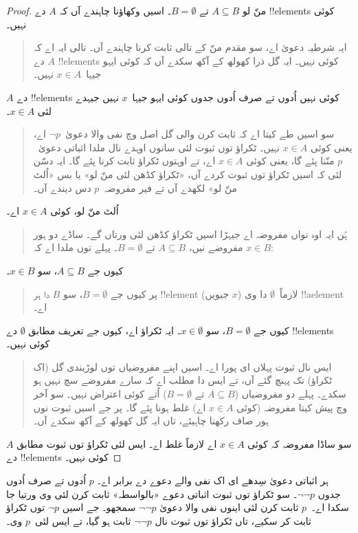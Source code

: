 \documentclass[../../../include/open-logic-section]{subfiles}
\begin{document}
\begin{proof}
  منّ لو $A \subseteq B$ تے $B = \emptyset$۔ اسیں وکھاؤنا چاہندے آں کہ $A$ دے !!{element}s کوئی نہیں۔
  \begin{quote}
    ایہ شرطیہ دعویٰ اے، سو مقدم منّ کے تالی ثابت کرنا چاہندے آں۔ تالی ایہ اے کہ $A$ دے !!{element}s کوئی نہیں۔ ایہ گل ذرا کھولھ کے آکھ سکدے آں کہ کوئی ایہو جیہا~$x \in A$ نہیں۔
  \end{quote}
  $A$ دے !!{element}s کوئی نہیں اُدوں تے صرف اُدوں جدوں کوئی ایہو جیہا~$x$ نہیں جیہدے لئی $x \in A$۔
  \begin{quote}
    سو اسیں طے کیتا اے کہ ثابت کرن والی گل اصل وچ نفی والا دعویٰ~$\lnot p$ اے، یعنی کوئی $x \in A$ نہیں۔ ٹکراؤ توں ثبوت لئی سانوں اوہدے نال ملدا اثباتی دعویٰ~$p$ منّنا پئے گا، یعنی کوئی $x \in A$ اے، تے اوہتوں ٹکراؤ ثابت کرنا پئے گا۔ ایہ دسّن لئی کہ اسیں ٹکراؤ توں ثبوت کردے آں، «ٹکراؤ کڈھن لئی منّ لو» یا بس «اُلٹ منّ لو» لکھدے آں تے فیر مفروضہ~$p$ دس دیندے آں۔
  \end{quote}
  اُلٹ منّ لو، کوئی $x \in A$ اے۔
  \begin{quote}
    ہُن ایہ اوہ نواں مفروضہ اے جیہڑا اسیں ٹکراؤ کڈھن لئی ورتاں گے۔ ساڈے دو ہور مفروضے نیں، $A \subseteq B$ تے $B = \emptyset$۔ پہلے توں ملدا اے کہ $x \in B$:
  \end{quote}
  کیوں جے $A \subseteq B$، سو $x \in B$۔
  \begin{quote}
    پر کیوں جے $B = \emptyset$، سو $B$ دا ہر !!{element} (جیویں $x$) لازماً~$\emptyset$ دا وی !!a{element} اے۔
  \end{quote}
  کیوں جے $B = \emptyset$، سو $x \in \emptyset$۔ ایہ ٹکراؤ اے، کیوں جے تعریف مطابق $\emptyset$ دے !!{element}s کوئی نہیں۔
  \begin{quote}
    ایس نال ثبوت پہلاں ای پورا اے۔ اسیں اپنے مفروضیاں توں لوڑیندی گل (اک ٹکراؤ) تک پہنچ گئے آں، تے ایس دا مطلب اے کہ سارے مفروضے سچ نہیں ہو سکدے۔ پہلے دو مفروضیاں ($A \subseteq B$ تے $B = \emptyset$) اُتے کوئی اعتراض نہیں۔ سو آخر وچ پیش کیتا مفروضہ (کوئی $x \in A$ اے) غلط ہونا پئے گا۔ پر جے اسیں ثبوت نوں ہور صاف رکھنا چاہیئے، تاں ایہ گل کھولھ کے آکھ سکدے آں۔
  \end{quote}
  سو ساڈا مفروضہ کہ کوئی $x \in A$ اے لازماً غلط اے۔ ایس لئی ٹکراؤ توں ثبوت مطابق $A$ دے !!{element}s کوئی نہیں۔
\end{proof}

ہر اثباتی دعویٰ سِدھے ای اک نفی والے دعوے دے برابر اے۔ $p$ اُدوں تے صرف اُدوں جدوں $\lnot\lnot p$۔ سو ٹکراؤ توں ثبوت اثباتی دعوے «بالواسطہ» ثابت کرن لئی وی ورتیا جا سکدا اے۔~$p$ ثابت کرن لئی اینوں نفی والا دعویٰ $\lnot\lnot p$ سمجھو۔ جے اسیں $\lnot p$ توں ٹکراؤ ثابت کر سکیے، تاں ٹکراؤ توں ثبوت نال $\lnot\lnot p$ ثابت ہو گیا، تے ایس لئی~$p$ وی۔
\end{document}
